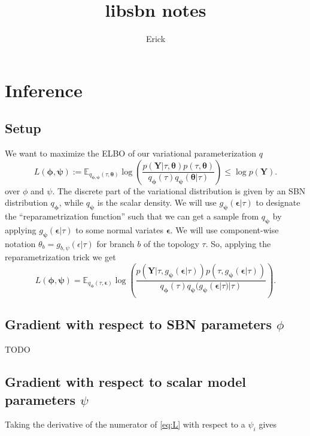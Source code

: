 \documentclass{article}
\title{libsbn notes}
\author{Erick}
\begin{document}


\section*{Inference}

\subsection*{Setup}
We want to maximize the ELBO of our variational parameterization $q$
\[
L(\bm{\phi},{\bm{\psi}}) := \mathbb{E}_{q_{\bm{\phi},{\bm{\psi}}}(\tau, \bm{\theta})}\log\left(\frac{p(\bm{Y}|\tau, \bm{\theta}) p(\tau, \bm{\theta})}{q_{\bm{\phi}}(\tau)q_{\bm{\psi}}(\bm{\theta}|\tau)}\right) \leq \log p(\bm{Y}).
\]
over $\phi$ and $\psi$.
The discrete part of the variational distribution is given by an SBN distribution $q_\bm\phi$, while $q_\bm\psi$ is the scalar density.
We will use $g_{\bm{\psi}}(\bm{\epsilon}|\tau)$ to designate the ``reparametrization function'' such that we can get a sample from $q_\bm\psi$ by applying $g_{\bm{\psi}}(\bm{\epsilon}|\tau)$ to some normal variates $\bm\epsilon$.
We will use component-wise notation $\theta_b = g_{b, \psi}(\epsilon|\tau)$ for branch $b$ of the topology $\tau$.
So, applying the reparametrization trick we get
\begin{equation}
L(\bm{\phi},{\bm{\psi}}) = \mathbb{E}_{
    q_{\bm{\phi}}(\tau,\bm{\epsilon})}
    \log\left(
        \frac
        {p(\bm{Y}|\tau,g_{\bm{\psi}}(\bm{\epsilon}|\tau))p(\tau, g_{\bm{\psi}}(\bm{\epsilon}|\tau))}
        {q_{\bm{\phi}}(\tau)q_{\bm{\psi}}(g_{\bm{\psi}}(\bm{\epsilon}|\tau)|\tau)}
    \right).
\label{eq:L}
\end{equation}

\subsection*{Gradient with respect to SBN parameters $\phi$}

TODO

\subsection*{Gradient with respect to scalar model parameters $\psi$}

Taking the derivative of the numerator of \eqref{eq:L} with respect to a $\psi_i$ gives
\end{document}
